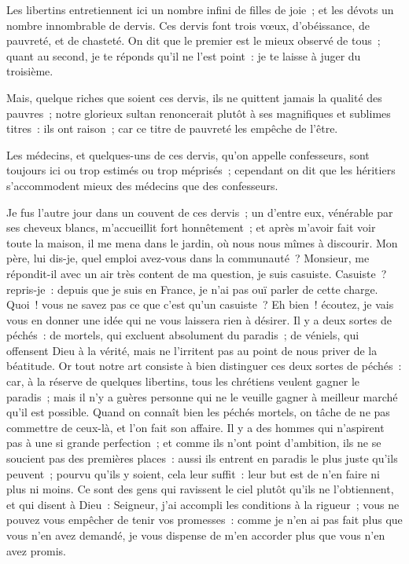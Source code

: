 \documentclass[french,twoside]{book} %
\begin{document}
\noindent Les libertins entretiennent ici un nombre infini de filles de joie ; et les dévots un nombre innombrable de dervis. Ces dervis font trois vœux, d’obéissance, de pauvreté, et de chasteté. On dit que le premier est le mieux observé de tous ; quant au second, je te réponds qu’il ne l’est point : je te laisse à juger du troisième.\par
Mais, quelque riches que soient ces dervis, ils ne quittent jamais la qualité des pauvres ; notre glorieux sultan renoncerait plutôt à ses magnifiques et sublimes titres : ils ont raison ; car ce titre de pauvreté les empêche de l’être.\par
Les médecins, et quelques-uns de ces dervis, qu’on appelle confesseurs, sont toujours ici ou trop estimés ou trop méprisés ; cependant on dit que les héritiers s’accommodent mieux des médecins que des confesseurs.\par
Je fus l’autre jour dans un couvent de ces dervis ; un d’entre eux, vénérable par ses cheveux blancs, m’accueillit fort honnêtement ; et après m’avoir fait voir toute la maison, il me mena dans le jardin, où nous nous mîmes à discourir. Mon père, lui dis-je, quel emploi avez-vous dans la communauté ? Monsieur, me répondit-il avec un air très content de ma question, je suis casuiste. Casuiste ? repris-je : depuis que je suis en France, je n’ai pas ouï parler de cette charge. Quoi ! vous ne savez pas ce que c’est qu’un casuiste ? Eh bien ! écoutez, je vais vous en donner une idée qui ne vous laissera rien à désirer. Il y a deux sortes de péchés : de mortels, qui excluent absolument du paradis ; de véniels, qui offensent Dieu à la vérité, mais ne l’irritent pas au point de nous priver de la béatitude. Or tout notre art consiste à bien distinguer ces deux sortes de péchés : car, à la réserve de quelques libertins, tous les chrétiens veulent gagner le paradis ; mais il n’y a guères personne qui ne le veuille gagner à meilleur marché qu’il est possible. Quand on connaît bien les péchés mortels, on tâche de ne pas commettre de ceux-là, et l’on fait son affaire. Il y a des hommes qui n’aspirent pas à une si grande perfection ; et comme ils n’ont point d’ambition, ils ne se soucient pas des premières places : aussi ils entrent en paradis le plus juste qu’ils peuvent ; pourvu qu’ils y soient, cela leur suffit : leur but est de n’en faire ni plus ni moins. Ce sont des gens qui ravissent le ciel plutôt qu’ils ne l’obtiennent, et qui disent à Dieu : Seigneur, j’ai accompli les conditions à la rigueur ; vous ne pouvez vous empêcher de tenir vos promesses : comme je n’en ai pas fait plus que vous n’en avez demandé, je vous dispense de m’en accorder plus que vous n’en avez promis.\par
\end{document}
